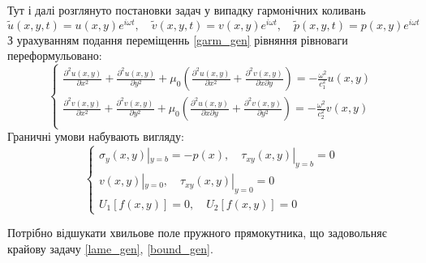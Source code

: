 Тут і далі розглянуто постановки задач у випадку гармонічних коливань
\begin{equation}\label{garm_gen}
    \widetilde{u}(x,y,t) = u(x,y) e^{i \omega t}, \quad \widetilde{v}(x,y,t) = v(x,y) e^{i \omega t}, \quad \widetilde{p}(x, y, t) = p(x, y) e^{i \omega t}
\end{equation}
З урахуванням подання переміщеннь \eqref{garm_gen} рівняння рівноваги переформульовано:
\begin{equation}\label{lame_gen}
    \begin{cases}
        \frac{\partial^2 u(x,y)}{\partial x^2} + \frac{\partial^2 u(x,y)}{\partial y^2} + \mu_0 (\frac{\partial^2 u(x,y)}{\partial x^2} + \frac{\partial^2 v(x,y)}{\partial x\partial y}) = -\frac{\omega^2}{c_1^2}  u(x,y) \\
        \frac{\partial^2 v(x,y)}{\partial x^2} + \frac{\partial^2 v(x,y)}{\partial y^2} + \mu_0 (\frac{\partial^2 u(x,y)}{\partial x \partial y} + \frac{\partial^2 v(x,y)}{\partial y^2}) = -\frac{\omega^2}{c_2^2} v(x,y) \\
    \end{cases}
\end{equation}
Граничні умови набувають вигляду:
\begin{equation}\label{bound_gen}
    \begin{cases}
        \sigma_y(x, y) |_{y=b} = -p(x), \quad  \tau_{xy}(x,y) |_{y=b} =0 \\
        v(x,y) |_{y=0}, \quad \tau_{xy}(x,y) |_{y=0} =0 \\
        U_1[f(x,y)]=0, \quad U_2[f(x,y)]=0
    \end{cases}
\end{equation}


Потрібно відшукати хвильове поле пружного прямокутника,
що задовольняє крайову задачу \eqref{lame_gen}, \eqref{bound_gen}.

